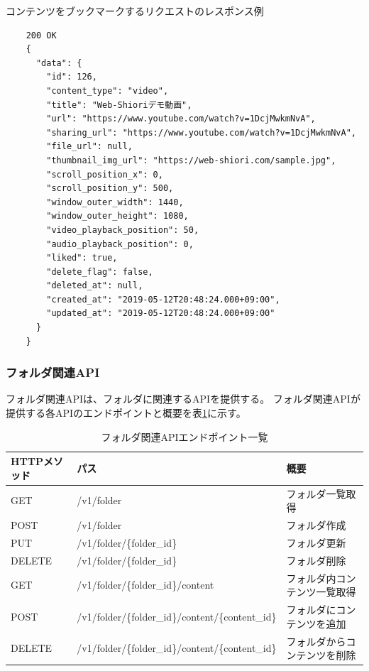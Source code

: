 \begin{itembox}[l]{コンテンツをブックマークするリクエストのレスポンス例}
  \label{content-response-json}
  \begin{verbatim}
    200 OK
    {
      "data": {
        "id": 126,
        "content_type": "video",
        "title": "Web-Shioriデモ動画",
        "url": "https://www.youtube.com/watch?v=1DcjMwkmNvA",
        "sharing_url": "https://www.youtube.com/watch?v=1DcjMwkmNvA",
        "file_url": null,
        "thumbnail_img_url": "https://web-shiori.com/sample.jpg",
        "scroll_position_x": 0,
        "scroll_position_y": 500,
        "window_outer_width": 1440,
        "window_outer_height": 1080,
        "video_playback_position": 50,
        "audio_playback_position": 0,
        "liked": true,
        "delete_flag": false,
        "deleted_at": null,
        "created_at": "2019-05-12T20:48:24.000+09:00",
        "updated_at": "2019-05-12T20:48:24.000+09:00"
      }
    }
  \end{verbatim}
\end{itembox}

\subsubsection{フォルダ関連API}
フォルダ関連APIは、フォルダに関連するAPIを提供する。
フォルダ関連APIが提供する各APIのエンドポイントと概要を表\ref{tb:design-folder-api}に示す。

\begin{table}[htbp]
  \label{tb:design-folder-api}
  \caption{フォルダ関連APIエンドポイント一覧}
  \begin{center}
    \begin{tabular}{|l|l|l|}
      \hline
      HTTPメソッド & パス & 概要 \\\hline\hline
      GET & /v1/folder & フォルダ一覧取得 \\\hline
      POST & /v1/folder & フォルダ作成 \\\hline
      PUT & /v1/folder/\{folder\_id\} & フォルダ更新 \\\hline
      DELETE & /v1/folder/\{folder\_id\} & フォルダ削除 \\\hline
      GET & /v1/folder/\{folder\_id\}/content & フォルダ内コンテンツ一覧取得 \\\hline
      POST & /v1/folder/\{folder\_id\}/content/\{content\_id\} & フォルダにコンテンツを追加 \\\hline
      DELETE & /v1/folder/\{folder\_id\}/content/\{content\_id\} & フォルダからコンテンツを削除 \\\hline
    \end{tabular}
  \end{center}
\end{table}

